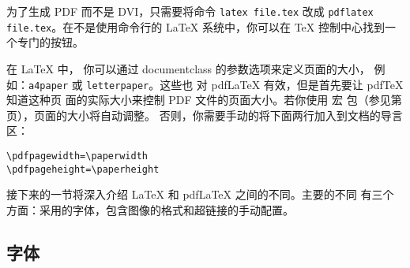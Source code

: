为了生成 PDF 而不是 DVI，只需要将命令 \texttt{latex
file.tex} 改成 \texttt{pdflatex
file.tex}。在不是使用命令行的 \LaTeX{} 系统中，你可以在 \TeX{} 控制中心找到一个专门的按钮。


在 \LaTeX{} 中，
你可以通过 documentclass 的参数选项来定义页面的大小，
例如：\texttt{a4paper} 或 \texttt{letterpaper}。这些也
对 pdf\LaTeX{} 有效，但是首先要让 pdf\TeX{} 知道这种页
面的实际大小来控制 PDF 文件的页面大小。若你使用  宏
包（参见第 \pageref{ssec:pdfhyperref} 页），页面的大小将自动调整。
否则，你需要手动的将下面两行加入到文档的导言区：
\begin{code}
\begin{verbatim}
\pdfpagewidth=\paperwidth
\pdfpageheight=\paperheight
\end{verbatim}
\end{code}


接下来的一节将深入介绍 \LaTeX{} 和 pdf\LaTeX{} 之间的不同。主要的不同
有三个方面：采用的字体，包含图像的格式和超链接的手动配置。

\subsection{字体}

